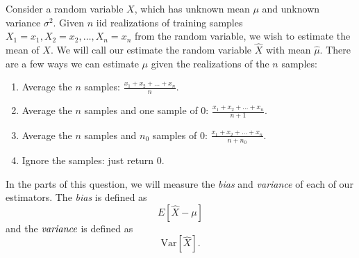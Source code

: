 Consider a random variable $X$, which has unknown mean $\mu$ and
unknown variance $\sigma^2$. Given $n$ iid realizations of training samples $X_1=x_1,
X_2=x_2, \ldots, X_n=x_n$ from the random variable, we wish to
estimate the mean of $X$. We will call our estimate the random variable
$\hat{X}$ with mean $\hat{\mu}$. There are a few ways we can estimate
$\mu$ given the realizations of the $n$ samples:
\begin{enumerate}
	\item Average the $n$ samples: $\frac{x_1+x_2+\ldots+x_n}{n}$.
	\item Average the $n$ samples and one sample of $0$: $\frac{x_1+x_2+\ldots+x_n}{n+1}$.
	\item Average the $n$ samples and $n_0$ samples of $0$: $\frac{x_1+x_2+\ldots+x_n}{n+n_0}$.
	\item Ignore the samples: just return $0$.
\end{enumerate}

In the parts of this question, we will measure the \emph{bias} and \emph{variance} of each of our estimators. The \emph{bias} is defined as $$E[\hat{X} - \mu]$$ and the $\emph{variance}$ is defined as $$\text{Var}[\hat{X}].$$

